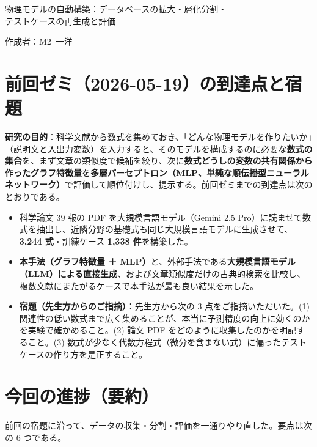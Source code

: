 \documentclass[11pt,a4paper]{ltjsarticle}
\begin{document}
\begin{center}
{\sffamily\large 物理モデルの自動構築：データベースの拡大・層化分割・\\テストケースの再生成と評価}
\end{center}
\vspace{0.3em}
\hfill 作成者：M2\ 一洋
\vspace{0.8em}

\section{前回ゼミ（2026-05-19）の到達点と宿題}
\textbf{研究の目的}：科学文献から数式を集めておき、「どんな物理モデルを作りたいか」（説明文と入出力変数）を入力すると、そのモデルを構成するのに必要な\textbf{数式の集合}を、まず文章の類似度で候補を絞り、次に\textbf{数式どうしの変数の共有関係から作ったグラフ特徴量}を\textbf{多層パーセプトロン（MLP、単純な順伝播型ニューラルネットワーク）}で評価して順位付けし、提示する。前回ゼミまでの到達点は次のとおりである。

\begin{itemize}[leftmargin=1.5em]
  \item 科学論文 39 報の PDF を大規模言語モデル（Gemini 2.5 Pro）に読ませて数式を抽出し、近隣分野の基礎式も同じ大規模言語モデルに生成させて、\textbf{3{,}244 式}・訓練ケース \textbf{1{,}338 件}を構築した。
  \item \textbf{本手法（グラフ特徴量 ＋ MLP）}と、外部手法である\textbf{大規模言語モデル（LLM）による直接生成}、および文章類似度だけの古典的検索を比較し、複数文献にまたがるケースで本手法が最も良い結果を示した。
  \item \textbf{宿題（先生方からのご指摘）}：先生方から次の 3 点をご指摘いただいた。(1) 関連性の低い数式まで広く集めることが、本当に予測精度の向上に効くのかを実験で確かめること。(2) 論文 PDF をどのように収集したのかを明記すること。(3) 数式が少なく代数方程式（微分を含まない式）に偏ったテストケースの作り方を是正すること。
\end{itemize}

\section{今回の進捗（要約）}
前回の宿題に沿って、データの収集・分割・評価を一通りやり直した。要点は次の 6 つである。
\end{document}
